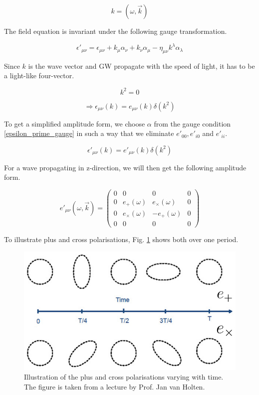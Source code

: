 \begin{equation}
    k=(\omega, \vec{k})
\end{equation}

The field equation is invariant under the following gauge transformation. 

\begin{equation}
    \epsilon '_{\mu\nu}=\epsilon_{\mu\nu}+k_\mu \alpha_\nu + k_\nu \alpha_\mu - \eta_{\mu\nu}k^\lambda \alpha_\lambda
    \label{epsilon_prime_gauge}
\end{equation}

Since $k$ is the wave vector and GW propagate with the speed of light, it has to be a light-like four-vector.

\begin{equation}
    k^2=0
\end{equation}

\begin{equation}
    \Rightarrow \epsilon_{\mu\nu}(k) = e_{\mu\nu} (k)\delta(k^2)
\end{equation}

To get a simplified amplitude form, we choose $\alpha$ from the gauge condition \ref{epsilon_prime_gauge} in such a way that we eliminate $e'_{00}, e'_{i0}$ and $e'_{ii}$. 

\begin{equation}
    \epsilon '_{\mu\nu}(k) = e'_{\mu\nu} (k)\delta(k^2) 
\end{equation}

For a wave propagating in z-direction, we will then get the following amplitude form.

\begin{equation}
    e'_{\mu\nu}(\omega, \vec{k})=
    \begin{pmatrix}
        0 & 0 & 0 & 0 \\
        0 & e_+(\omega) & e_\times(\omega) & 0 \\ 
        0 & e_\times(\omega) & -e_+(\omega) & 0 \\
        0 & 0 & 0 & 0
    \end{pmatrix}
\end{equation}

To illustrate plus and cross polarisations, Fig. \ref{polarisation} shows both over one period.

\begin{figure}[h]
    \centering
    \includegraphics[width=0.4\linewidth]{Images/polarisations.png}
    \caption[Illustration of the plus and cross polarisations varying with time.]{Illustration of the plus and cross polarisations varying with time. The figure is taken from a lecture by Prof. Jan van Holten.}
    \label{polarisation}
\end{figure} 


